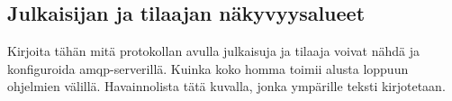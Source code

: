 \subsection{Julkaisijan ja tilaajan näkyvyysalueet}
\begin{it}
	Kirjoita tähän mitä protokollan avulla julkaisuja ja tilaaja voivat nähdä ja konfiguroida amqp-serverillä. Kuinka koko homma toimii alusta loppuun ohjelmien välillä. Havainnolista tätä kuvalla, jonka ympärille teksti kirjotetaan.
\end{it}

